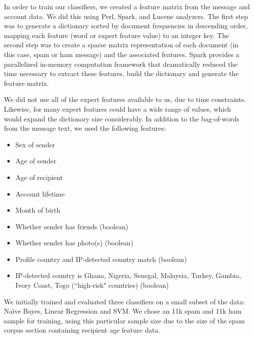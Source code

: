 \documentclass[preprint]{acm_proc_article-sp}
\begin{document}
In order to train our classifiers, we created a feature matrix from the message and account data. We did this using 
Perl, Spark, and Lucene analyzers. The first step was to generate a dictionary sorted by document frequencies in descending 
order, mapping each feature (word or expert feature value) to an integer key. The second step was to create a sparse 
matrix representation of each document (in this case, spam or ham message) and the associated features. Spark provides a 
parallelized in-memory computation framework that dramatically reduced the time necessary to extract these features, 
build the dictionary and generate the feature matrix. 

We did not use all of the expert features available to us, due to time constraints. Likewise, for many expert features could 
have a wide range of values, which would expand the dictionary size considerably. In addition to the bag-of-words from the 
message text, we used the following features:
\begin{itemize}
\item Sex of sender
\item Age of sender
\item Age of recipient
\item Account lifetime
\item Month of birth 
\item Whether sender has friends (boolean)
\item Whether sender has photo(s) (boolean)
\item Profile country and IP-detected country match (boolean)
\item IP-detected country is Ghana, Nigeria, Senegal, Malaysia, Turkey, Gambia, Ivory Coast, Togo (``high-risk" countries) (boolean)
\end{itemize}

We initially trained and evaluated three classifiers on a small subset of the data: Na\"ive Bayes, Linear Regression and SVM. 
We chose an 11k spam and 11k ham sample for training, using this particular sample size due to the size of the spam corpus 
section containing recipient age feature data.  

%
%
%
%
\end{document}
